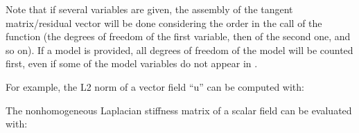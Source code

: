 \documentclass[a4paper,11pt,english]{sphinxmanual}
\begin{document}
\begin{fulllineitems}
Note that if several variables are given, the assembly of the
tangent matrix/residual vector will be done considering the order
in the call of the function (the degrees of freedom of the first
variable, then of the second one, and so on). If a model is provided,
all degrees of freedom of the model will be counted first, even if
some of the model variables do not appear in .

For example, the L2 norm of a vector field “u” can be computed with:

\begin{sphinxVerbatim}[commandchars=\\\{\}]
      

        
\end{sphinxVerbatim}

The nonhomogeneous Laplacian stiffness matrix of a scalar field can be evaluated with:

\begin{sphinxVerbatim}[commandchars=\\\{\}]
       

            
\end{sphinxVerbatim}

\end{fulllineitems}
\end{document}
